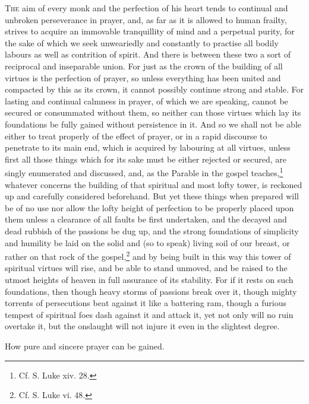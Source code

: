 \textsc{The} aim of every monk and the perfection of his heart tends to continual and unbroken perseverance in prayer, and, as far as it is allowed to human frailty, strives to acquire an immovable tranquillity of mind and a perpetual purity, for the sake of which we seek unweariedly and constantly to practise all bodily labours as well as contrition of spirit. And there is between these two a sort of reciprocal and inseparable union. For just as the crown of the building of all virtues is the perfection of prayer, so unless everything has been united and compacted by this as its crown, it cannot possibly continue strong and stable. For lasting and continual calmness in prayer, of which we are speaking, cannot be secured or consummated without them, so neither can those virtues which lay its foundations be fully gained without persistence in it. And so we shall not be able either to treat properly of the effect of prayer, or in a rapid discourse to penetrate to its main end, which is acquired by labouring at all virtues, unless first all those things which for its sake must be either rejected or secured, are singly enumerated and discussed, and, as the Parable in the gospel teaches,\footnote{Cf. S. Luke xiv. 28.} whatever concerns the building of that spiritual and most lofty tower, is reckoned up and carefully considered beforehand. But yet these things when prepared will be of no use nor allow the lofty height of perfection to be properly placed upon them unless a clearance of all faults be first undertaken, and the decayed and dead rubbish of the passions be dug up, and the strong foundations of simplicity and humility be laid on the solid and (so to speak) living soil of our breast, or rather on that rock of the gospel,\footnote{Cf. S. Luke vi. 48.} and by being built in this way this tower of spiritual virtues will rise, and be able to stand unmoved, and be raised to the utmost heights of heaven in full assurance of its stability. For if it rests on such foundations, then though heavy storms of passions break over it, though mighty torrents of persecutions beat against it like a battering ram, though a furious tempest of spiritual foes dash against it and attack it, yet not only will no ruin overtake it, but the onslaught will not injure it even in the slightest degree.


How pure and sincere prayer can be gained.

